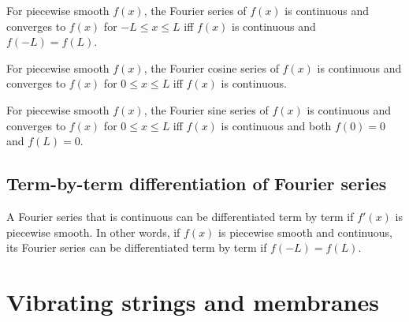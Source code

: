 \documentclass{article}
\begin{document}
\begin{proposition}
	For piecewise smooth \(f(x)\), the Fourier series of \(f(x)\) is continuous and converges to \(f(x)\) for \(-L\leq x\leq L\) iff \(f(x)\) is continuous and \(f(-L)=f(L)\).
\end{proposition}
\begin{proposition}
	For piecewise smooth \(f(x)\), the Fourier cosine series of \(f(x)\) is continuous and converges to \(f(x)\) for \(0\leq x\leq L\) iff \(f(x)\) is continuous.
\end{proposition}
\begin{proposition}
	For piecewise smooth \(f(x)\), the Fourier sine series of \(f(x)\) is continuous and converges to \(f(x)\) for \(0\leq x\leq L\) iff \(f(x)\) is continuous and both \(f(0)=0\) and \(f(L)=0\).
\end{proposition}
\subsection{Term-by-term differentiation of Fourier series}
\begin{theorem}
	A Fourier series that is continuous can be differentiated term by term if \(f'(x)\) is piecewise smooth. In other words, if \(f(x)\) is piecewise smooth and continuous, its Fourier series can be differentiated term by term if \(f(-L)=f(L)\).
\end{theorem}
\section{Vibrating strings and membranes}
\end{document}
